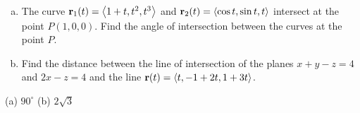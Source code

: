 \begin{question}[M200 2001D] %
\begin{enumerate}[(a)]
\item
The curve $\mathbf{r}_1(t)=\left< 1+t, t^2, t^3\right>$ and 
$\mathbf{r}_2(t)=\left< \cos t, \sin t, t\right>$ intersect at the point $P(1,0,0)$. 
Find the angle of intersection between the curves at the point $P$.

\item 
Find the distance between the line of intersection of the
planes $x+y-z=4$ and $2x-z=4$ and the line $\mathbf{r}(t)=\left< t, -1+2t, 1+3t\right>$.

\end{enumerate}
\end{question}


\begin{answer}
(a) $90^\circ$\qquad
(b) $2\sqrt{3}$
\end{answer}


